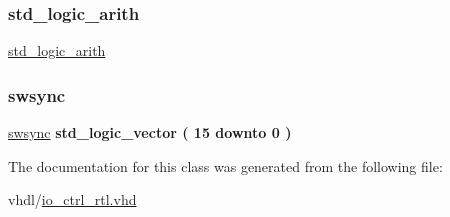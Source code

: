 \mbox{\label{classio__ctrl_1_1rtl_a0f5ecc6613f63d07f7963a97b1b26095}} 
\subsubsection{\texorpdfstring{std\+\_\+logic\+\_\+arith}{std\_logic\_arith}}
{\footnotesize\ttfamily \hyperlink{classio__ctrl_1_1rtl_a0f5ecc6613f63d07f7963a97b1b26095}{std\+\_\+logic\+\_\+arith}\hspace{0.3cm}{\ttfamily [Package]}}

\mbox{\label{classio__ctrl_1_1rtl_a9beb24b7dc36ee4c13f031555d2ceb3c}} 
\subsubsection{\texorpdfstring{swsync}{swsync}}
{\footnotesize\ttfamily \hyperlink{classio__ctrl_1_1rtl_a9beb24b7dc36ee4c13f031555d2ceb3c}{swsync} {\bfseries \textcolor{comment}{std\+\_\+logic\+\_\+vector}\textcolor{vhdlchar}{ }\textcolor{vhdlchar}{(}\textcolor{vhdlchar}{ }\textcolor{vhdlchar}{ } \textcolor{vhdldigit}{15} \textcolor{vhdlchar}{ }\textcolor{keywordflow}{downto}\textcolor{vhdlchar}{ }\textcolor{vhdlchar}{ } \textcolor{vhdldigit}{0} \textcolor{vhdlchar}{ }\textcolor{vhdlchar}{)}\textcolor{vhdlchar}{ }} \hspace{0.3cm}{\ttfamily [Signal]}}



The documentation for this class was generated from the following file\+:\begin{DoxyCompactItemize}
\item 
vhdl/\hyperlink{io__ctrl__rtl_8vhd}{io\+\_\+ctrl\+\_\+rtl.\+vhd}\end{DoxyCompactItemize}
